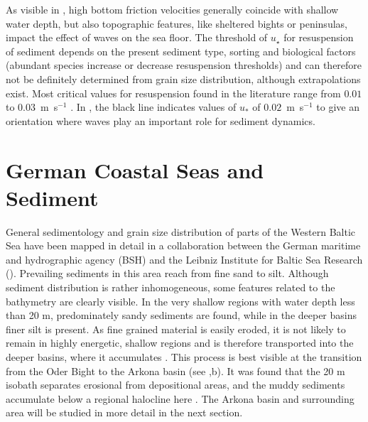 As visible in , high bottom friction velocities generally 
coincide with shallow water depth, but also topographic features, like 
sheltered bights or peninsulas, impact the effect of waves on the sea floor. 
The threshold of $u_\star$ for resuspension of sediment depends on the present 
sediment type, sorting and biological factors (abundant species increase or 
decrease resuspension thresholds) and can therefore not be definitely determined 
from grain size distribution, although extrapolations exist. Most critical 
values for resuspension found in the literature range from $0.01$ to 
$0.03$~m~s$^{-1}$ \citep[][]{jonsson2004}. In , the black line 
indicates values of $u_\ast$ of $0.02$~m~s$^{-1}$ to give an orientation where 
waves play an important role for sediment dynamics.
% 
\FloatBarrier
\section{German Coastal Seas and Sediment}

General sedimentology and grain size distribution of parts of the Western 
Baltic Sea have 
been mapped in detail in a collaboration between the German maritime and 
hydrographic agency (BSH) and the Leibniz Institute for Baltic Sea Research 
(). Prevailing sediments in this area reach from 
fine sand to silt. Although sediment distribution is rather inhomogeneous, some 
features related to the bathymetry are clearly visible. In the very shallow 
regions with water depth less than 20 m, predominately sandy sediments are 
found, while in the deeper basins finer silt is present.
As fine grained material is easily eroded, it is not likely to remain in highly 
energetic, shallow regions and is therefore transported into the deeper basins, 
where 
it accumulates \citep[][]{basys1}. This process is best visible at the 
transition from the Oder Bight to the Arkona basin (see ,b). 
It was found that the 20 m isobath separates erosional from depositional areas, 
and the muddy sediments accumulate below a regional halocline here 
\citep[][]{basys2}. The Arkona basin and surrounding area will be studied in 
more detail in the next section.

